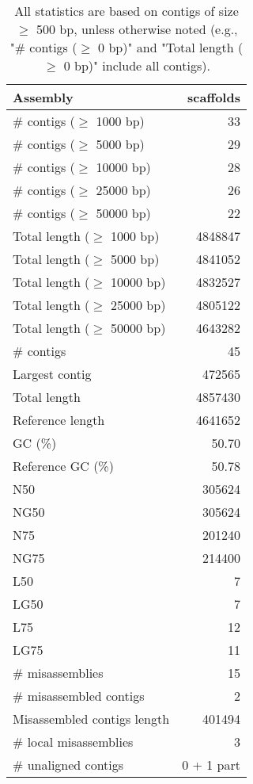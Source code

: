 \documentclass[12pt,a4paper]{article}
\begin{document}
\begin{table}[ht]
\begin{center}
\caption{All statistics are based on contigs of size $\geq$ 500 bp, unless otherwise noted (e.g., "\# contigs ($\geq$ 0 bp)" and "Total length ($\geq$ 0 bp)" include all contigs).}
\begin{tabular}{|l*{1}{|r}|}
\hline
Assembly & scaffolds \\ \hline
\# contigs ($\geq$ 1000 bp) & 33 \\ \hline
\# contigs ($\geq$ 5000 bp) & 29 \\ \hline
\# contigs ($\geq$ 10000 bp) & 28 \\ \hline
\# contigs ($\geq$ 25000 bp) & 26 \\ \hline
\# contigs ($\geq$ 50000 bp) & 22 \\ \hline
Total length ($\geq$ 1000 bp) & 4848847 \\ \hline
Total length ($\geq$ 5000 bp) & 4841052 \\ \hline
Total length ($\geq$ 10000 bp) & 4832527 \\ \hline
Total length ($\geq$ 25000 bp) & 4805122 \\ \hline
Total length ($\geq$ 50000 bp) & 4643282 \\ \hline
\# contigs & 45 \\ \hline
Largest contig & 472565 \\ \hline
Total length & 4857430 \\ \hline
Reference length & 4641652 \\ \hline
GC (\%) & 50.70 \\ \hline
Reference GC (\%) & 50.78 \\ \hline
N50 & 305624 \\ \hline
NG50 & 305624 \\ \hline
N75 & 201240 \\ \hline
NG75 & 214400 \\ \hline
L50 & 7 \\ \hline
LG50 & 7 \\ \hline
L75 & 12 \\ \hline
LG75 & 11 \\ \hline
\# misassemblies & 15 \\ \hline
\# misassembled contigs & 2 \\ \hline
Misassembled contigs length & 401494 \\ \hline
\# local misassemblies & 3 \\ \hline
\# unaligned contigs & 0 + 1 part \\ \hline

\end{tabular}
\end{center}
\end{table}
\end{document}
